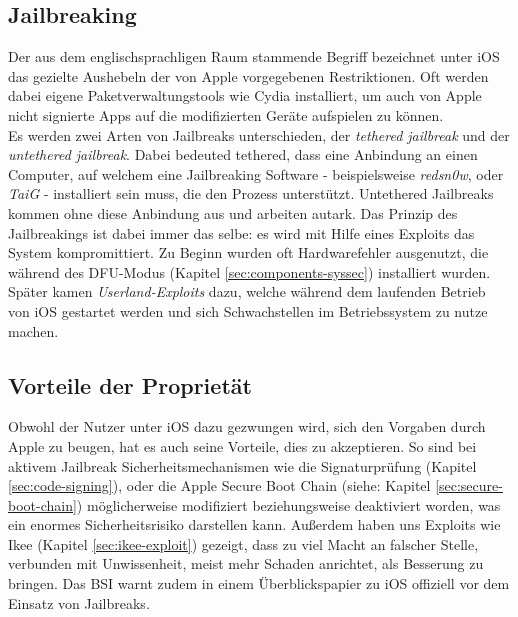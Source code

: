 	\subsection{Jailbreaking}\label{sec:jailbreaking}
		Der aus dem englischsprachligen Raum stammende Begriff bezeichnet unter iOS
		das gezielte Aushebeln der von Apple vorgegebenen Restriktionen. Oft werden
		dabei eigene Paketverwaltungstools wie
		Cydia\cite{Cydia2015} installiert, um auch von Apple nicht
		signierte Apps auf die modifizierten Geräte aufspielen zu können.\\
		Es werden zwei Arten von Jailbreaks unterschieden, der \textsl{tethered
		jailbreak} und der \textsl{untethered jailbreak}. Dabei bedeuted tethered,
		dass eine Anbindung an einen Computer, auf welchem eine Jailbreaking Software
		- beispielsweise \textsl{redsn0w}, oder	\textsl{TaiG} - installiert sein muss, die
		den Prozess unterstützt. Untethered Jailbreaks kommen ohne diese Anbindung aus
		und arbeiten autark. Das Prinzip des Jailbreakings ist dabei immer das selbe:
		es wird mit Hilfe eines Exploits das System kompromittiert. Zu Beginn wurden oft
		Hardwarefehler ausgenutzt, die während des
		DFU-Modus (Kapitel \ref{sec:components-syssec}) installiert wurden.
		Später kamen \textsl{Userland-Exploits} dazu, welche während dem
		laufenden Betrieb von iOS gestartet werden und sich Schwachstellen im
		Betriebssystem zu nutze machen.
	
	\subsection{Vorteile der Proprietät}
		Obwohl der Nutzer unter iOS dazu gezwungen wird, sich den Vorgaben durch Apple
		zu beugen, hat es auch seine Vorteile, dies zu akzeptieren. So sind bei
		aktivem Jailbreak Sicherheitsmechanismen wie die Signaturprüfung (Kapitel
		\ref{sec:code-signing}), oder die Apple Secure Boot	Chain (siehe: Kapitel
		\ref{sec:secure-boot-chain}) möglicherweise modifiziert beziehungsweise
		deaktiviert worden, was ein enormes Sicherheitsrisiko darstellen kann.
		Außerdem haben uns Exploits wie Ikee (Kapitel \ref{sec:ikee-exploit})
		gezeigt, dass zu viel Macht an falscher Stelle, verbunden mit Unwissenheit,
		meist mehr Schaden anrichtet, als Besserung zu bringen. Das BSI warnt
		zudem in einem Überblickspapier zu iOS offiziell vor dem Einsatz von
		Jailbreaks\cite{BSIJailbreak2013}.

